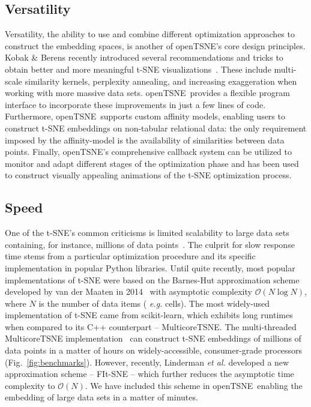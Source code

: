 \documentclass[twocolumn]{article}
\newcommand{\opentsne}{\textsf{openTSNE}}
\begin{document}
\subsection*{Versatility}

Versatility, the ability to use and combine different optimization approaches to
construct the embedding spaces, is another of \opentsne's core design
principles. Kobak \& Berens recently introduced several recommendations and
tricks to obtain better and more meaningful t-SNE
visualizations~\cite{kobak2019art}. These include multi-scale similarity
kernels, perplexity annealing, and increasing exaggeration when working with
more massive data sets. \opentsne\ provides a flexible program interface to
incorporate these improvements in just a few lines of code. Furthermore, \opentsne\
supports custom affinity models, enabling users to construct t-SNE embeddings on
non-tabular relational data: the only requirement imposed by the affinity-model
is the availability of similarities between data points.
Finally, \opentsne's comprehensive callback system can be utilized
to monitor and adapt different stages of the optimization phase and has been
used to construct visually appealing animations of the t-SNE optimization
process.


\subsection*{Speed}

One of the t-SNE's common criticisms is limited scalability to large data sets
containing, for instance, millions of data
points~\cite{becht2019dimensionality}. The culprit for slow response time stems
from a particular optimization procedure and its specific implementation in
popular Python libraries. Until quite recently, most popular
implementations of t-SNE were based on the Barnes-Hut approximation scheme
developed by van der Maaten in 2014~\cite{van2014accelerating} with asymptotic
complexity $\mathcal{O}(N \log N)$, where $N$ is the number of data items ({\em
e.g.} cells). The most widely-used implementation of t-SNE came from
\textsf{scikit-learn}, which exhibits long runtimes when compared to its C++
counterpart -- \textsf{MulticoreTSNE}. The multi-threaded \textsf{MulticoreTSNE}
implementation~\cite{Ulyanov2016} can construct t-SNE embeddings of millions of
data points in a matter of hours on widely-accessible, consumer-grade processors
(Fig.~\ref{fig:benchmarks}). However, recently, Linderman \textit{et al.}
developed a new approximation scheme -- FIt-SNE -- which further reduces the
asymptotic time complexity to $\mathcal{O}(N)$. We have included this scheme in
\opentsne\, enabling the embedding of large data sets in a matter of minutes. 
\end{document}

